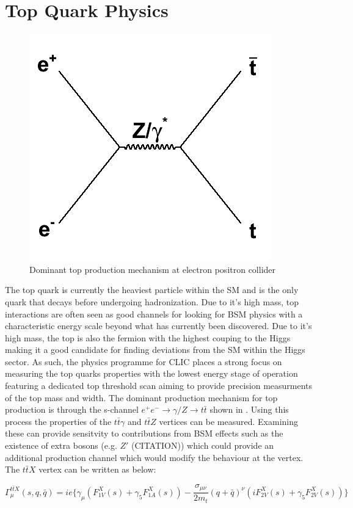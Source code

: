 \section{Top Quark Physics}

\begin{figure}
\centering
\includegraphics[width=0.35\linewidth]{Theory/fig/ttFeynmann}
\caption[Dominant top production mechanism at electron positron colliders]{Dominant top production mechanism at electron positron collider}
\label{fig:topFeynmann}
\end{figure}

The top quark is currently the heaviest particle within the \ac{SM} and is the only quark that decays before undergoing hadronization. Due to it's high mass, top interactions are often seen as good channels for looking for \ac{BSM} physics with a characteristic energy scale beyond what has currently been discovered. Due to it's high mass, the top is also the fermion with the highest couping to the Higgs making it a good candidate for finding deviations from the \ac{SM} within the Higgs sector. As such, the physics programme for \ac{CLIC} places a strong focus on measuring the top quarks properties with the lowest energy stage of operation featuring a dedicated top threshold scan aiming to provide precision measurments of the top mass and width. The dominant production mechanism for top production is through the s-channel $e^+e^-\rightarrow\gamma /Z\rightarrow t\bar{t}$ shown in . Using this process the properties of the $t\bar{t}\gamma$ and $t\bar{t}Z$ vertices can be measured. Examining these can provide sensitvity to contributions from \ac{BSM} effects such as the existence of extra bosons (e.g. $Z'$ (CITATION)) which could provide an additional production channel which would modify the behaviour at the vertex. The  $t\bar{t}X$ vertex can be written as below:

\begin{equation}
\Gamma_{\mu}^{t\bar{t}X}(s,q,\bar{q})= ie\{ \gamma_{\mu}(F_{1V}^{X}(s)+ \gamma_{5}F_{1A}^{X}(s)) - \frac{\sigma_{\mu\nu}}{2m_t}(q+\bar{q})^{\nu}(iF_{2V}^{X}(s) + \gamma_{5}F_{2V}^{X}(s))\}
\end{equation}

